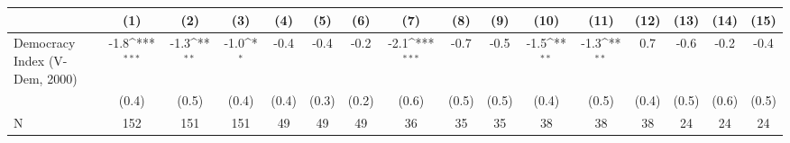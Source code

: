 {
\def\sym#1{\ifmmode^{#1}\else\(^{#1}\)\fi}
\begin{tabular}{l*{15}{c}}
\hline\hline
                    &\multicolumn{1}{c}{(1)}         &\multicolumn{1}{c}{(2)}         &\multicolumn{1}{c}{(3)}         &\multicolumn{1}{c}{(4)}         &\multicolumn{1}{c}{(5)}         &\multicolumn{1}{c}{(6)}         &\multicolumn{1}{c}{(7)}         &\multicolumn{1}{c}{(8)}         &\multicolumn{1}{c}{(9)}         &\multicolumn{1}{c}{(10)}         &\multicolumn{1}{c}{(11)}         &\multicolumn{1}{c}{(12)}         &\multicolumn{1}{c}{(13)}         &\multicolumn{1}{c}{(14)}         &\multicolumn{1}{c}{(15)}         \\
\hline
Democracy Index (V-Dem, 2000)&        -1.8\sym{***}&        -1.3\sym{**} &        -1.0\sym{*}  &        -0.4         &        -0.4         &        -0.2         &        -2.1\sym{***}&        -0.7         &        -0.5         &        -1.5\sym{**} &        -1.3\sym{**} &         0.7         &        -0.6         &        -0.2         &        -0.4         \\
                    &       (0.4)         &       (0.5)         &       (0.4)         &       (0.4)         &       (0.3)         &       (0.2)         &       (0.6)         &       (0.5)         &       (0.5)         &       (0.4)         &       (0.5)         &       (0.4)         &       (0.5)         &       (0.6)         &       (0.5)         \\
\hline
N                   &         152         &         151         &         151         &          49         &          49         &          49         &          36         &          35         &          35         &          38         &          38         &          38         &          24         &          24         &          24         \\
\hline\hline
\end{tabular}
}
